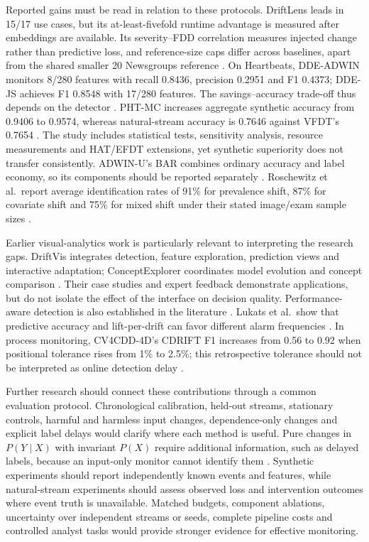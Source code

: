 \documentclass[10pt,a4paper]{article}
\begin{document}
Reported gains must be read in relation to these protocols. DriftLens leads in 15/17 use cases, but its at-least-fivefold runtime advantage is measured after embeddings are available. Its severity--FDD correlation measures injected change rather than predictive loss, and reference-size caps differ across baselines, apart from the shared smaller 20 Newsgroups reference \cite[Sec.~V]{greco}. On Heartbeats, DDE-ADWIN monitors 8/280 features with recall 0.8436, precision 0.2951 and F1 0.4373; DDE-JS achieves F1 0.8548 with 17/280 features. The savings--accuracy trade-off thus depends on the detector \cite[Table~4]{szucs}. PHT-MC increases aggregate synthetic accuracy from 0.9406 to 0.9574, whereas natural-stream accuracy is 0.7646 against VFDT's 0.7654 \cite[Tables~7,14]{guerrero}. The study includes statistical tests, sensitivity analysis, resource measurements and HAT/EFDT extensions, yet synthetic superiority does not transfer consistently. ADWIN-U's BAR combines ordinary accuracy and label economy, so its components should be reported separately \cite[Eq.~5]{assis}. Roschewitz et al.\ report average identification rates of 91\% for prevalence shift, 87\% for covariate shift and 75\% for mixed shift under their stated image/exam sample sizes \cite[Sec.~4.2]{roschewitz}.

Earlier visual-analytics work is particularly relevant to interpreting the research gaps. DriftVis integrates detection, feature exploration, prediction views and interactive adaptation; ConceptExplorer coordinates model evolution and concept comparison \cite{driftvis,conceptexplorer}. Their case studies and expert feedback demonstrate applications, but do not isolate the effect of the interface on decision quality. Performance-aware detection is also established in the literature \cite{bayram}. Lukats et al.\ show that predictive accuracy and lift-per-drift can favor different alarm frequencies \cite{lukats}. In process monitoring, CV4CDD-4D's CDRIFT F1 increases from 0.56 to 0.92 when positional tolerance rises from 1\% to 2.5\%; this retrospective tolerance should not be interpreted as online detection delay \cite[Table~3]{kraus}.

Further research should connect these contributions through a common evaluation protocol. Chronological calibration, held-out streams, stationary controls, harmful and harmless input changes, dependence-only changes and explicit label delays would clarify where each method is useful. Pure changes in $P(Y\mid X)$ with invariant $P(X)$ require additional information, such as delayed labels, because an input-only monitor cannot identify them \cite[Sec.~6]{driftvis}. Synthetic experiments should report independently known events and features, while natural-stream experiments should assess observed loss and intervention outcomes where event truth is unavailable. Matched budgets, component ablations, uncertainty over independent streams or seeds, complete pipeline costs and controlled analyst tasks would provide stronger evidence for effective monitoring.
\end{document}
